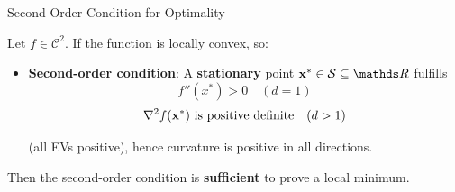 \documentclass[11pt,compress,t,notes=noshow, xcolor=table]{beamer}
\begin{document}
  \begin{vbframe}{Second Order Condition for Optimality}
  

  
  Let $f \in \mathcal{C}^2$.  If the function is locally convex, so:

  \begin{itemize}
    \item \textbf{Second-order condition}: A \textbf{stationary} point $\xv^\ast \in \mathcal{S}\subseteq \R$ fulfills
    $$f''(x^\ast) > 0 \quad (d = 1) $$ 
    $$\nabla^2 f(\mathbf{x}^\ast) \text{ is positive definite} \quad (d > 1) $$
    \begin{footnotesize}
    (all EVs positive), hence curvature is positive in all directions. 
    \end{footnotesize}
  \end{itemize}
  
 Then the second-order condition is \textbf{sufficient} to prove a local minimum. 


\end{vbframe}
\end{document}
